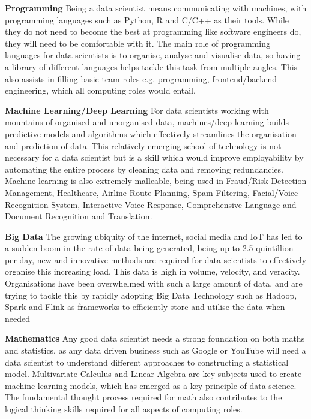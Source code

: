 \documentclass[a4paper, 11pt]{report}
\begin{document}
\textbf{Programming}
Being a data scientist means communicating with machines, with programming languages such as Python, R and C/C++ as their tools. While they do not need to become the best at programming like software engineers do, they will need to be comfortable with it. The main role of programming languages for data scientists is to organise, analyse and visualise data, so having a library of different languages helps tackle this task from multiple angles. This also assists in filling basic team roles e.g. programming, frontend/backend engineering, which all computing roles would entail.

\textbf{Machine Learning/Deep Learning}
For data scientists working with mountains of organised and unorganised data, machines/deep learning builds predictive models and algorithms which effectively streamlines the organisation and prediction of data. This relatively emerging school of technology is not necessary for a data scientist but is a skill which would improve employability by automating the entire process by cleaning data and removing redundancies. Machine learning is also extremely malleable, being used in Fraud/Risk Detection Management, Healthcare, Airline Route Planning, Spam Filtering, Facial/Voice Recognition System, Interactive Voice Response, Comprehensive Language and Document Recognition and Translation.

\textbf{Big Data}
The growing ubiquity of the internet, social media and IoT has led to a sudden boom in the rate of data being generated, being up to 2.5 quintillion per day, new and innovative methods are required for data scientists to effectively organise this increasing load. This data is high in volume, velocity, and veracity. Organisations have been overwhelmed with such a large amount of data, and are trying to tackle this by rapidly adopting Big Data Technology such as Hadoop, Spark and Flink as frameworks to efficiently store and utilise the data when needed 

\textbf{Mathematics}
Any good data scientist needs a strong foundation on both maths and statistics, as any data driven business such as Google or YouTube will need a data scientist to understand different approaches to constructing a statistical model.  Multivariate Calculus and Linear Algebra are key subjects used to create machine learning models, which has emerged as a key principle of data science. The fundamental thought process required for math also contributes to the logical thinking skills required for all aspects of computing roles.
\end{document}

